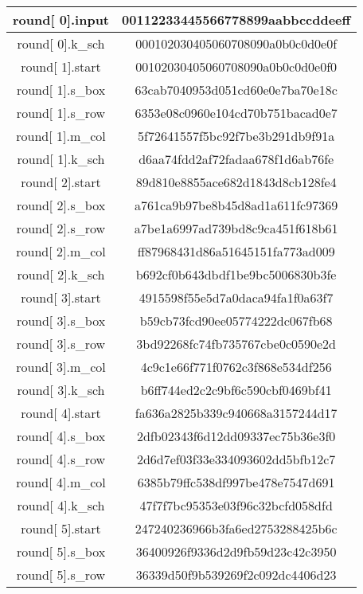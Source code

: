 \begin{center}
\begin{longtable}{ |c|c| } 
\hline
round[ 0].input &  00112233445566778899aabbccddeeff \\
\hline
round[ 0].k\_sch &  000102030405060708090a0b0c0d0e0f\\
\hline
round[ 1].start &  00102030405060708090a0b0c0d0e0f0\\
\hline
round[ 1].s\_box &  63cab7040953d051cd60e0e7ba70e18c\\
\hline
round[ 1].s\_row &  6353e08c0960e104cd70b751bacad0e7\\
\hline
round[ 1].m\_col &  5f72641557f5bc92f7be3b291db9f91a\\
\hline
round[ 1].k\_sch &  d6aa74fdd2af72fadaa678f1d6ab76fe\\
\hline
round[ 2].start &  89d810e8855ace682d1843d8cb128fe4\\
\hline
round[ 2].s\_box &  a761ca9b97be8b45d8ad1a611fc97369\\
\hline
round[ 2].s\_row  & a7be1a6997ad739bd8c9ca451f618b61\\
\hline
round[ 2].m\_col  & ff87968431d86a51645151fa773ad009\\
\hline
round[ 2].k\_sch  & b692cf0b643dbdf1be9bc5006830b3fe\\
\hline
round[ 3].start  & 4915598f55e5d7a0daca94fa1f0a63f7\\
\hline
round[ 3].s\_box  & b59cb73fcd90ee05774222dc067fb68\\
\hline
round[ 3].s\_row  & 3bd92268fc74fb735767cbe0c0590e2d\\
\hline
round[ 3].m\_col  & 4c9c1e66f771f0762c3f868e534df256\\
\hline
round[ 3].k\_sch  & b6ff744ed2c2c9bf6c590cbf0469bf41\\
\hline
round[ 4].start  & fa636a2825b339c940668a3157244d17\\
\hline
round[ 4].s\_box  & 2dfb02343f6d12dd09337ec75b36e3f0\\
\hline
round[ 4].s\_row  & 2d6d7ef03f33e334093602dd5bfb12c7\\
\hline
round[ 4].m\_col  & 6385b79ffc538df997be478e7547d691\\
\hline
round[ 4].k\_sch  & 47f7f7bc95353e03f96c32bcfd058dfd\\
\hline
round[ 5].start  & 247240236966b3fa6ed2753288425b6c\\
\hline
round[ 5].s\_box  & 36400926f9336d2d9fb59d23c42c3950\\
\hline
round[ 5].s\_row  & 36339d50f9b539269f2c092dc4406d23\\

\end{longtable}
\end{center}
